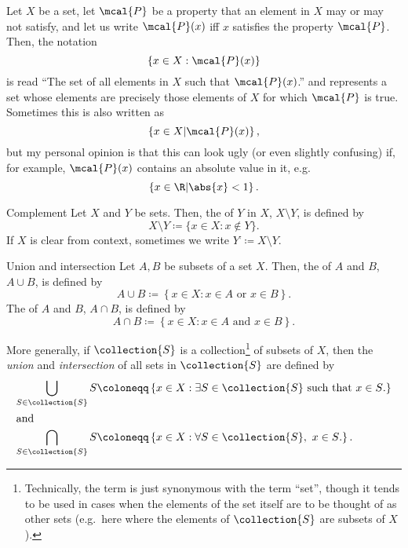 \begin{rmk}
Let $X$ be a set, let $\mcal{P}$ be a property that an element in $X$ may or may not satisfy, and let us write $\mcal{P}(x)$ iff $x$ satisfies the property $\mcal{P}$.  Then, the notation
\begin{equation*}
\left\{ x\in X:\mcal{P}(x)\right\}
\end{equation*}
is read ``The set of all elements in $X$ such that $\mcal{P}(x)$.'' and represents a set whose elements are precisely those elements of $X$ for which $\mcal{P}$ is true.  Sometimes this is also written as
\begin{equation*}
\left\{ x\in X|\mcal{P}(x)\right\} ,
\end{equation*}
but my personal opinion is that this can look ugly (or even slightly confusing) if, for example, $\mcal{P}(x)$ contains an absolute value in it, e.g.
\begin{equation*}
\left\{ x\in \R |\abs{x}<1\right\} .
\end{equation*}
\end{rmk}
\begin{dfn}{Complement}{}
Let $X$ and $Y$ be sets.  Then, the  of $Y$ in $X$, $X\setminus Y$, is defined by
\begin{equation}
X\setminus Y\coloneqq \{ x\in X:x\notin Y\} .
\end{equation}
If $X$ is clear from context, sometimes we write $Y^{\comp}\coloneqq X\setminus Y$.
\end{dfn}
\begin{dfn}{Union and intersection}{}
Let $A,B$ be subsets of a set $X$.  Then, the  of $A$ and $B$, $A\cup B$, is defined by
\begin{equation}
A\cup B\coloneqq \left\{ x\in X:x\in A\text{ or }x\in B\right\} .
\end{equation}
The  of $A$ and $B$, $A\cap B$, is defined by
\begin{equation}
A\cap B\coloneqq \left\{ x\in X:x\in A\text{ and }x\in B\right\} .
\end{equation}
\begin{rmk}
More generally, if $\collection{S}$ is a collection\footnote{Technically, the term  is just synonymous with the term ``set'', though it tends to be used in cases when the elements of the set itself are to be thought of as other sets (e.g.~here where the elements of $\collection{S}$ are subsets of $X$).} of subsets of $X$, then the \emph{union} and \emph{intersection} of all sets in $\collection{S}$ are defined by
\begin{align*}
\bigcup _{S\in \collection{S}}S & \coloneqq \left\{ x\in X:\exists S\in \collection{S}\text{ such that }x\in S\text{.}\right\} \\
\intertext{and}
\bigcap _{S\in \collection{S}}S & \coloneqq \left\{ x\in X:\forall S\in \collection{S},\ x\in S\text{.}\right\} .
\end{align*}
\end{rmk}
\end{dfn}
